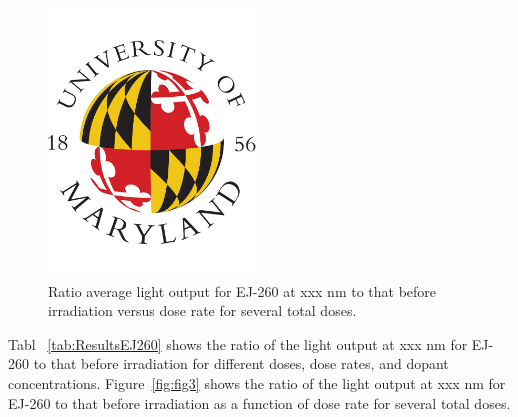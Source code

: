 \documentclass[review]{elsarticle}
\begin{document}
\begin{figure}[!ht]
\begin{center}
\includegraphics[width=0.49\textwidth]{./figures/placeholder.pdf}
\caption{
Ratio average light output for EJ-260 at {\color{red} xxx nm} to that before irradiation versus dose rate for several total doses.
}
\label{fig:fig2}
\end{center}
\end{figure}

Tabl ~\ref{tab:ResultsEJ260} shows the ratio of the light output at {\color{red} xxx nm}
for EJ-260 to that before irradiation for different doses, dose rates, and
dopant concentrations.
Figure~\ref{fig:fig3} shows the ratio of the light output at {\color{red} xxx nm}
for EJ-260 to that before irradiation as a function of dose rate
for several total doses.
\end{document}
